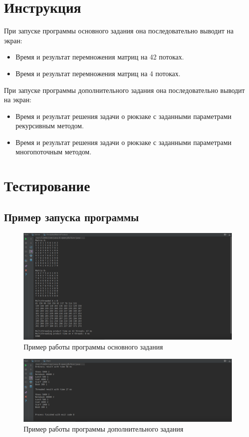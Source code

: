 \documentclass{article}
\begin{document}
\section{Инструкция}
При запуске программы основного задания она последовательно выводит на экран:
\begin{itemize}
	\item Время и результат перемножения матриц на 42 потоках.

	\item Время и результат перемножения матриц на 4 потоках.
\end{itemize}

При запуске программы дополнительного задания она последовательно выводит на экран:
\begin{itemize}
	\item Время и результат решения задачи о рюкзаке с заданными параметрами рекурсивным методом.

	\item Время и результат решения задачи о рюкзаке с заданными параметрами многопоточным методом.
\end{itemize}

\section{Тестирование}

\subsection{Пример запуска программы}
\begin{figure}[H]
	\begin{flushleft}
		\centerline{\includegraphics[scale=0.55]{lab8_main.png}}
		\caption{Пример работы программы основного задания}
	\end{flushleft}
\end{figure}
\begin{figure}[H]
	\begin{flushleft}
		\centerline{\includegraphics[scale=0.55]{lab8_add.png}}
		\caption{Пример работы программы дополнительного задания}
	\end{flushleft}
\end{figure}
\end{document}

